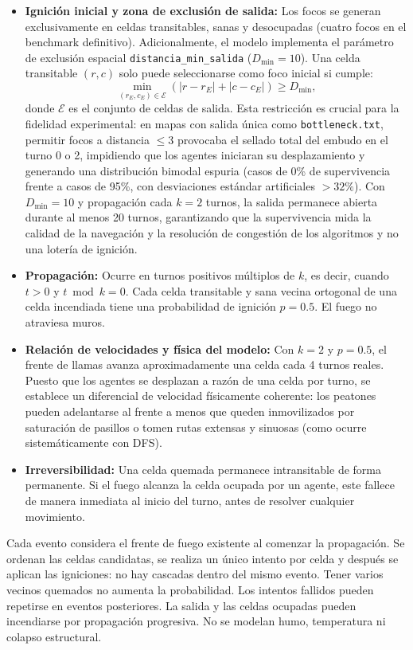 \documentclass[11pt,letterpaper]{article}
\begin{document}
\begin{itemize}
    \item \textbf{Ignición inicial y zona de exclusión de salida:} Los focos se generan exclusivamente en celdas transitables, sanas y desocupadas (cuatro focos en el benchmark definitivo). Adicionalmente, el modelo implementa el parámetro de exclusión espacial \texttt{distancia\_min\_salida} ($D_{\min} = 10$). Una celda transitable $(r, c)$ solo puede seleccionarse como foco inicial si cumple:
    \[
        \min_{(r_E, c_E) \in \mathcal{E}} \left( |r - r_E| + |c - c_E| \right) \ge D_{\min},
    \]
    donde $\mathcal{E}$ es el conjunto de celdas de salida. Esta restricción es crucial para la fidelidad experimental: en mapas con salida única como \texttt{bottleneck.txt}, permitir focos a distancia $\le 3$ provocaba el sellado total del embudo en el turno 0 o 2, impidiendo que los agentes iniciaran su desplazamiento y generando una distribución bimodal espuria (casos de 0\% de supervivencia frente a casos de 95\%, con desviaciones estándar artificiales $>32\%$). Con $D_{\min} = 10$ y propagación cada $k=2$ turnos, la salida permanece abierta durante al menos 20 turnos, garantizando que la supervivencia mida la calidad de la navegación y la resolución de congestión de los algoritmos y no una lotería de ignición.
    \item \textbf{Propagación:} Ocurre en turnos positivos múltiplos de $k$, es decir, cuando $t > 0$ y $t \bmod k = 0$. Cada celda transitable y sana vecina ortogonal de una celda incendiada tiene una probabilidad de ignición $p = 0.5$. El fuego no atraviesa muros.
    \item \textbf{Relación de velocidades y física del modelo:} Con $k=2$ y $p=0.5$, el frente de llamas avanza aproximadamente una celda cada 4 turnos reales. Puesto que los agentes se desplazan a razón de una celda por turno, se establece un diferencial de velocidad físicamente coherente: los peatones pueden adelantarse al frente a menos que queden inmovilizados por saturación de pasillos o tomen rutas extensas y sinuosas (como ocurre sistemáticamente con DFS).
    \item \textbf{Irreversibilidad:} Una celda quemada permanece intransitable de forma permanente. Si el fuego alcanza la celda ocupada por un agente, este fallece de manera inmediata al inicio del turno, antes de resolver cualquier movimiento.
\end{itemize}

Cada evento considera el frente de fuego existente al comenzar la propagación. Se ordenan las celdas candidatas, se realiza un único intento por celda y después se aplican las igniciones: no hay cascadas dentro del mismo evento. Tener varios vecinos quemados no aumenta la probabilidad. Los intentos fallidos pueden repetirse en eventos posteriores. La salida y las celdas ocupadas pueden incendiarse por propagación progresiva. No se modelan humo, temperatura ni colapso estructural.
\end{document}
